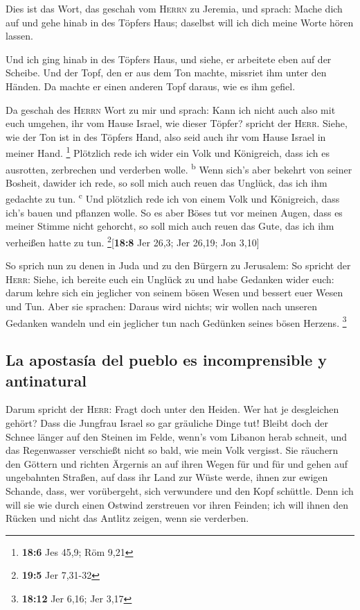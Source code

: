  Dies ist das Wort, das geschah vom \textsc{Herrn} zu
Jeremia, und sprach:  Mache dich auf und gehe hinab in des
Töpfers Haus; daselbst will ich dich meine Worte hören lassen.

 Und ich ging hinab in des Töpfers Haus, und siehe, er
arbeitete eben auf der Scheibe.  Und der Topf, den er aus
dem Ton machte, missriet ihm unter den Händen. Da machte er einen
anderen Topf daraus, wie es ihm gefiel.

 Da geschah des \textsc{Herrn} Wort zu mir und sprach:
 Kann ich nicht auch also mit euch umgehen, ihr vom Hause
Israel, wie dieser Töpfer? spricht der \textsc{Herr}. Siehe, wie der Ton
ist in des Töpfers Hand, also seid auch ihr vom Hause Israel in meiner
Hand. \footnote{\textbf{18:6} Jes 45,9; Röm 9,21} 
Plötzlich rede ich wider ein Volk und Königreich, dass ich es ausrotten,
zerbrechen und verderben wolle. \textsuperscript{b}  Wenn
sich's aber bekehrt von seiner Bosheit, dawider ich rede, so soll mich
auch reuen das Unglück, das ich ihm gedachte zu tun. \textsuperscript{c}
 Und plötzlich rede ich von einem Volk und Königreich,
dass ich's bauen und pflanzen wolle.  So es aber Böses
tut vor meinen Augen, dass es meiner Stimme nicht gehorcht, so soll mich
auch reuen das Gute, das ich ihm verheißen hatte zu tun.
\footnote{\textbf{19:5} Jer 7,31-32}{[}\textbf{18:8} Jer 26,3; Jer
26,19; Jon 3,10{]}

 So sprich nun zu denen in Juda und zu den Bürgern zu
Jerusalem: So spricht der \textsc{Herr}: Siehe, ich bereite euch ein
Unglück zu und habe Gedanken wider euch: darum kehre sich ein jeglicher
von seinem bösen Wesen und bessert euer Wesen und Tun. 
Aber sie sprachen: Daraus wird nichts; wir wollen nach unseren Gedanken
wandeln und ein jeglicher tun nach Gedünken seines bösen Herzens.
\footnote{\textbf{18:12} Jer 6,16; Jer 3,17}

\hypertarget{la-apostasuxeda-del-pueblo-es-incomprensible-y-antinatural}{%
\subsection{La apostasía del pueblo es incomprensible y
antinatural}\label{la-apostasuxeda-del-pueblo-es-incomprensible-y-antinatural}}

 Darum spricht der \textsc{Herr}: Fragt doch unter den
Heiden. Wer hat je desgleichen gehört? Dass die Jungfrau Israel so gar
gräuliche Dinge tut!  Bleibt doch der Schnee länger auf
den Steinen im Felde, wenn's vom Libanon herab schneit, und das
Regenwasser verschießt nicht so bald, wie mein Volk vergisst.
 Sie räuchern den Göttern und richten Ärgernis an auf
ihren Wegen für und für und gehen auf ungebahnten Straßen,
 auf dass ihr Land zur Wüste werde, ihnen zur ewigen
Schande, dass, wer vorübergeht, sich verwundere und den Kopf schüttle.
 Denn ich will sie wie durch einen Ostwind zerstreuen vor
ihren Feinden; ich will ihnen den Rücken und nicht das Antlitz zeigen,
wenn sie verderben.

